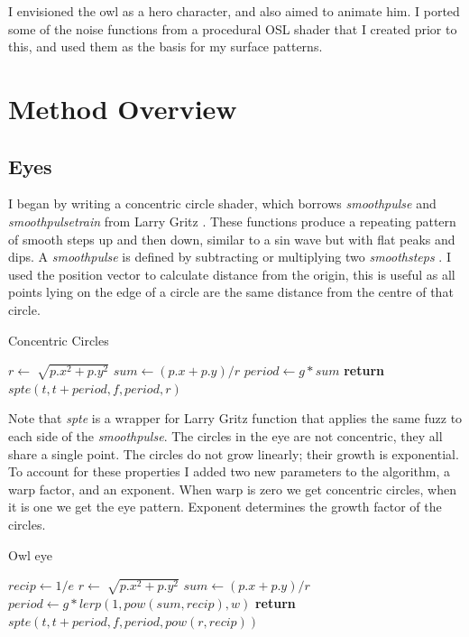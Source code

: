 \documentclass[]{acmsiggraph}
\begin{document}
I envisioned the owl as a hero character, and also aimed to animate him. I ported some of the noise functions from a procedural OSL shader that I created prior to this, and used them as the basis for my surface patterns.  

\section{Method Overview} \label{sec:overview}
\subsection{Eyes}
I began by writing a concentric circle shader, which borrows \textit{smoothpulse} and \textit{smoothpulsetrain} from Larry Gritz \cite{larrygritzarman}. These functions produce a repeating pattern of smooth steps up and then down, similar to a sin wave but with flat peaks and dips. A \textit{smoothpulse} is defined by subtracting or multiplying two \textit{smoothsteps} \cite{fundza}. I used the position vector to calculate distance from the origin, this is useful as all points lying on the edge of a circle are the same distance from the centre of that circle.
\begin{algorithm}
\caption{Concentric Circles}\label{alg:concircles}
\begin{algorithmic}[1]
\State $r\gets \sqrt[]{p.x^2 + p.y^2}$
\State $sum\gets (p.x + p.y)/r$
\State $period \gets g * sum$
\State \textbf{return} $spte(t, t + period, f, period, r)$
\EndProcedure
\end{algorithmic}
\end{algorithm}
\newline 
Note that \textit{spte} is a wrapper for Larry Gritz function that applies the same fuzz to each side of the \textit{smoothpulse}. The circles in the eye are not concentric, they all share a single point. The circles do not grow linearly; their growth is exponential. To account for these properties I added two new parameters to the algorithm, a warp factor, and an exponent. When warp is zero we get concentric circles, when it is one we get the eye pattern. Exponent determines the growth factor of the circles.
\begin{algorithm}
\caption{Owl eye}\label{alg:owleye}
\begin{algorithmic}[1]
\State $recip \gets 1/e$ 
\State $r\gets \sqrt[]{p.x^2 + p.y^2}$
\State $sum\gets (p.x + p.y)/r$
\State $period \gets g * lerp(1, pow(sum,recip), w)$
\State \textbf{return} $spte(t, t + period, f, period, pow(r, recip))$
\EndProcedure
\end{algorithmic}
\end{algorithm}
\end{document}
